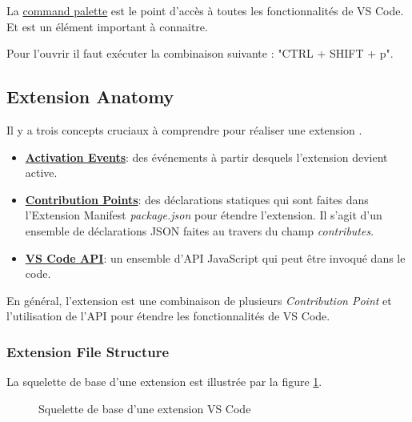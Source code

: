 \documentclass[
    iict, %
    il, %
]{heig-tb}
\begin{document}
La \href{https://code.visualstudio.com/docs/getstarted/userinterface#_command-palette}{command palette}
est le point d'accès à toutes les fonctionnalités de VS Code. Et est un élément important à connaitre.

Pour l'ouvrir il faut exécuter la combinaison suivante : "CTRL + SHIFT + p".


\subsection{Extension Anatomy}
Il y a trois concepts cruciaux à comprendre pour réaliser une extension \cite{extension-anatomy} .

\begin{itemize}
    \item \href{https://code.visualstudio.com/api/references/activation-events}{\textbf{Activation Events}}: des événements à partir desquels l'extension devient active.
    \item \href{https://code.visualstudio.com/api/references/contribution-points}{\textbf{Contribution Points}}: des déclarations statiques qui sont faites dans l'Extension Manifest \emph{package.json} pour étendre l'extension. Il s'agit d'un ensemble de déclarations JSON faites au travers du champ \emph{contributes}.
    \item \href{https://code.visualstudio.com/api/references/vscode-api}{\textbf{VS Code API}}: un ensemble d'API JavaScript qui peut être invoqué dans le code.
\end{itemize}

En général, l'extension est une combinaison de plusieurs \emph{Contribution Point} et l'utilisation de l'API pour étendre les fonctionnalités de VS Code.

\subsubsection{Extension File Structure}\label{Extension File Structure}

La squelette de base d'une extension est illustrée par la figure \ref{basic-structure}.

\begin{figure}[H] %
    \centering
    \caption[Squelette de base d'une extension VS Code]{\label{basic-structure} Squelette de base d'une extension VS Code}
\end{figure}
\end{document}
